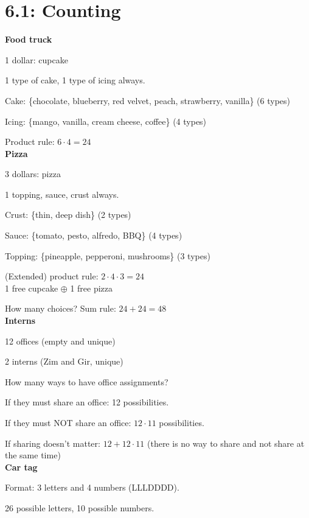 \documentclass{exam}
\begin{document}
	
    \section{6.1: Counting}
    
    \textbf{Food truck}
    
    1 dollar: cupcake
    
    1 type of cake, 1 type of icing always.
    
    Cake: \{chocolate, blueberry, red velvet, peach, strawberry, vanilla\} (6 types)
    
    Icing: \{mango, vanilla, cream cheese, coffee\} (4 types)
    
    Product rule: $6 \cdot 4 = 24$\\
    
    \textbf{Pizza}
    
    3 dollars: pizza
    
    1 topping, sauce, crust always.
    
    Crust: \{thin, deep dish\} (2 types)
    
    Sauce: \{tomato, pesto, alfredo, BBQ\} (4 types)
    
    Topping: \{pineapple, pepperoni, mushrooms\} (3 types)
    
    (Extended) product rule: $2 \cdot 4 \cdot 3 = 24$\\
    
    1 free cupcake $\oplus$ 1 free pizza
    
    How many choices? Sum rule: $24 + 24 = 48$\\
    
    \textbf{Interns}
    
    12 offices (empty and unique)
    
    2 interns (Zim and Gir, unique)
    
    How many ways to have office assignments?
    
    If they must share an office: 12 possibilities.
    
    If they must NOT share an office: $12 \cdot 11$ possibilities.
    
    If sharing doesn't matter: $12 + 12 \cdot 11$ (there is no way to share and not share at the same time)\\
    
    \textbf{Car tag}
    
    Format: 3 letters and 4 numbers (LLLDDDD).
    
    26 possible letters, 10 possible numbers.
    
\end{document}
